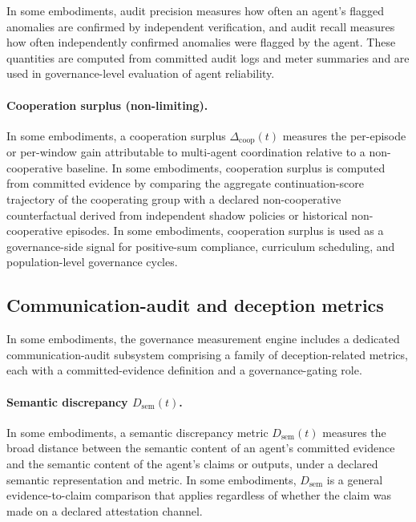 \documentclass[a4paper,12pt]{article}
\begin{document}
In some embodiments, audit precision measures how often an agent's
flagged anomalies are confirmed by independent verification, and audit
recall measures how often independently confirmed anomalies were
flagged by the agent. These quantities are computed from committed
audit logs and meter summaries and are used in governance-level
evaluation of agent reliability.

\paragraph{Cooperation surplus (non-limiting).}

In some embodiments, a cooperation surplus
$\Delta_{\mathrm{coop}}(t)$ measures the per-episode or per-window
gain attributable to multi-agent coordination relative to a
non-cooperative baseline. In some embodiments, cooperation surplus is
computed from committed evidence by comparing the aggregate
continuation-score trajectory of the cooperating group with a declared
non-cooperative counterfactual derived from independent shadow policies
or historical non-cooperative episodes. In some embodiments,
cooperation surplus is used as a governance-side signal for
positive-sum compliance, curriculum scheduling, and population-level
governance cycles.

\subsection{Communication-audit and deception metrics}
\label{sec:deception-metrics}

In some embodiments, the governance measurement engine includes a
dedicated communication-audit subsystem comprising a family of
deception-related metrics, each with a committed-evidence definition
and a governance-gating role.

\paragraph{Semantic discrepancy $D_{\mathrm{sem}}(t)$.}
In some embodiments, a semantic discrepancy metric
$D_{\mathrm{sem}}(t)$ measures the broad distance between the semantic
content of an agent's committed evidence and the semantic content of
the agent's claims or outputs, under a declared semantic
representation and metric. In some embodiments, $D_{\mathrm{sem}}$ is
a general evidence-to-claim comparison that applies regardless of
whether the claim was made on a declared attestation channel.
\end{document}
